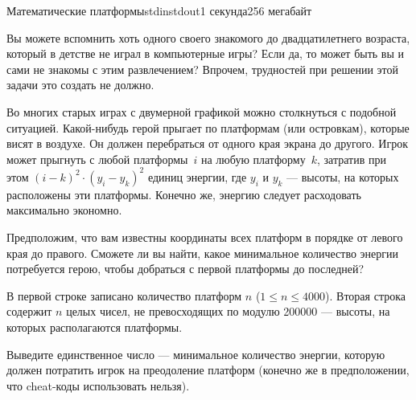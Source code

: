 \begin{problem}{Математические платформы}{stdin}{stdout}{1 секунда}{256 мегабайт}

Вы можете вспомнить хоть одного своего знакомого до двадцатилетнего возраста, который в детстве не играл в компьютерные игры? Если да, то может быть вы и сами не знакомы с этим развлечением? Впрочем, трудностей при решении этой задачи это создать не должно.

Во многих старых играх с двумерной графикой можно столкнуться с подобной ситуацией. Какой-нибудь герой прыгает по платформам (или островкам), которые висят в воздухе. Он должен перебраться от одного края экрана до другого. Игрок может прыгнуть с любой платформы~$i$ на любую платформу~$k$, затратив при этом $(i-k)^2\cdot(y_i-y_k)^2$ единиц энергии, где $y_i$ и $y_k$ --- высоты, на которых расположены эти платформы. Конечно же, энергию следует расходовать максимально экономно.

Предположим, что вам известны координаты всех платформ в порядке от левого края до правого. Сможете ли вы найти, какое минимальное количество энергии потребуется герою, чтобы добраться с первой платформы до последней? 

\InputFile
В первой строке записано количество платформ $n$ ($1\leqslant n\leqslant 4000$). Вторая строка содержит $n$ целых чисел, не превосходящих по модулю 200000 --- высоты, на которых располагаются платформы.

\OutputFile
Выведите единственное число --- минимальное количество энергии, которую должен потратить игрок на преодоление платформ (конечно же в предположении, что cheat-коды использовать нельзя).

\Examples

\begin{example}
%
\end{example}

\end{problem}
